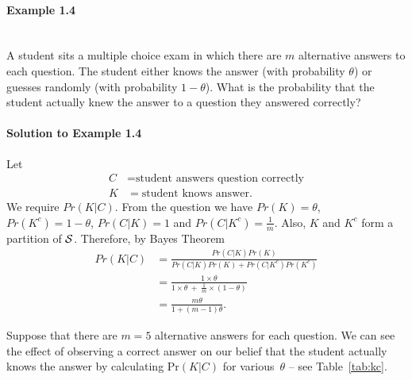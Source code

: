 \clearpage

\paragraph{Example 1.4}{~\\
A student sits a multiple choice exam in which there are $m$
alternative answers to each question. The student either knows the
answer (with probability $\theta$) or guesses randomly (with
probability $1-\theta$). What is the probability that the student
actually knew the answer to a question they answered correctly?
\label{ex:multiple}

\paragraph{Solution to Example 1.4}{
     
        Let
        \begin{align*}
        C&=\text{student answers question correctly} \\
        K&=\text{student knows answer}.
        \end{align*}
        We require $Pr(K|C)$. From the question we have $Pr(K)=\theta$,
        $Pr(K^c)=1-\theta$, $Pr(C|K)=1$ and $Pr(C|K^c)=\frac{1}{m}$.  Also,
        $K$ and $K^c$ form a partition of ${\cal S}$. Therefore, by Bayes
        Theorem
        \begin{align*}
        Pr(K|C)&=\frac{Pr(C|K)Pr(K)}{Pr(C|K)Pr(K)+Pr(C|K^c)Pr(K^c)} \\
        &=\frac{1\times\theta}{1\times\theta~+~\frac{1}{m}\times(1-\theta)} \\
        &=\frac{m\theta}{1+(m-1)\theta}.
        \end{align*}
     
 }

Suppose that there are $m=5$ alternative answers for each question. We
can see the effect of observing a correct answer on our belief
that the student actually knows the answer by calculating $\text{Pr}(K|C)$
for various~$\theta$ -- see Table~\ref{tab:kc}.}

